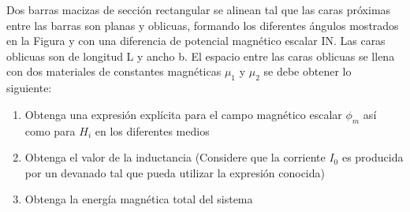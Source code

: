 \begin{problema}
    Dos barras macizas de sección rectangular se alinean tal que las caras próximas entre las barras son planas y oblicuas, formando los diferentes ángulos mostrados en la Figura y con una diferencia de potencial magnético escalar IN. Las caras oblicuas son de longitud L y ancho b. El espacio entre las caras oblicuas se llena con dos materiales de constantes magnéticas $\mu_{1}$ y $\mu_{2}$ se debe obtener lo siguiente:\
\begin{enumerate}
    \item Obtenga una expresión explícita para el campo magnético escalar $\phi_{m}$ así como para $H_{i}$ en los diferentes medios 
    \item  Obtenga el valor de la inductancia (Considere que la corriente $I_{0}$ es producida por un devanado tal que pueda utilizar la expresión conocida)
    \item Obtenga la energía magnética total del sistema 
\end{enumerate}
\end{problema}